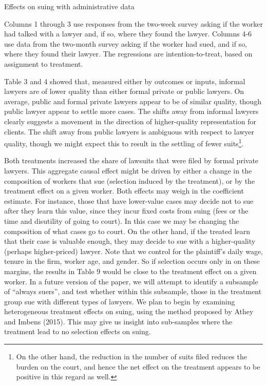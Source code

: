 \documentclass[oneside,12pt]{article}
\begin{document}
\begin{table}[!ht]
    \caption{Effects on suing with administrative data} 
    \label{tab:9_lawyer_uncond}
    \center
    \scriptsize{}
    \begin{figurenotes}
    Columns 1 through 3 use responses from the two-week survey asking if the worker had talked with a lawyer and, if so, where they found the lawyer. Columns 4-6 use data from the two-month survey asking if the worker had sued, and if so, where they found their lawyer. The regressions are intention-to-treat, based on assignment to treatment.
    \end{figurenotes}
  
\end{table}

Table 3 and 4 showed that, measured either by outcomes or inputs, informal lawyers are of lower quality than either formal private or public lawyers. On average, public and formal private lawyers appear to be of similar quality, though public lawyer appear to settle more cases. The shifts away from informal lawyers clearly suggests a movement in the direction of higher-quality representation for clients. The shift away from public lawyers is ambiguous with respect to lawyer quality, though we might expect this to result in the settling of fewer suits\footnote{ On the other hand, the reduction in the number of suits filed reduces the burden on the court, and hence the net effect on the treatment appears to be positive in this regard as well. }.  

Both treatments increased the share of lawsuits that were filed by formal private lawyers. This aggregate causal effect might be driven by either a change in the composition of workers that sue (selection induced by the treatment), or by the treatment effect on a given worker. Both effects may weigh in the coefficient estimate. For instance, those that have lower-value cases may decide not to sue after they learn this value, since they incur fixed costs from suing (fees or the time and disutility of going to court). In this case we may be changing the composition of what cases go to court. On the other hand, if the treated learn that their case is valuable enough, they may decide to sue with a higher-quality (perhaps higher-priced) lawyer. Note that we control for the plaintiff’s daily wage, tenure in the firm, worker age, and gender. So if selection occurs only in on these margins, the results in Table 9 would be close to the treatment effect on a given worker. In a future version of the paper, we will attempt to identify a subsample of “always suers”, and test whether within this subsample, those in the treatment group sue with different types of lawyers. We plan to begin by examining heterogeneous treatment effects on suing, using the method proposed by Athey and Imbens (2015). This may give us insight into sub-samples where the treatment lead to no selection effects on suing. 
\end{document}
